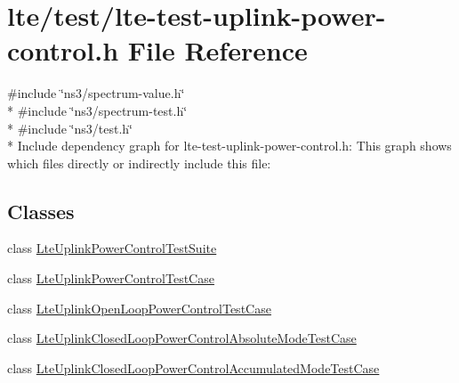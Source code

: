 \hypertarget{lte-test-uplink-power-control_8h}{}\section{lte/test/lte-\/test-\/uplink-\/power-\/control.h File Reference}
\label{lte-test-uplink-power-control_8h}
{\ttfamily \#include \char`\"{}ns3/spectrum-\/value.\+h\char`\"{}}\\*
{\ttfamily \#include \char`\"{}ns3/spectrum-\/test.\+h\char`\"{}}\\*
{\ttfamily \#include \char`\"{}ns3/test.\+h\char`\"{}}\\*
Include dependency graph for lte-\/test-\/uplink-\/power-\/control.h\+:
This graph shows which files directly or indirectly include this file\+:
\subsection*{Classes}
\begin{DoxyCompactItemize}
\item 
class \hyperlink{classLteUplinkPowerControlTestSuite}{Lte\+Uplink\+Power\+Control\+Test\+Suite}
\item 
class \hyperlink{classLteUplinkPowerControlTestCase}{Lte\+Uplink\+Power\+Control\+Test\+Case}
\item 
class \hyperlink{classLteUplinkOpenLoopPowerControlTestCase}{Lte\+Uplink\+Open\+Loop\+Power\+Control\+Test\+Case}
\item 
class \hyperlink{classLteUplinkClosedLoopPowerControlAbsoluteModeTestCase}{Lte\+Uplink\+Closed\+Loop\+Power\+Control\+Absolute\+Mode\+Test\+Case}
\item 
class \hyperlink{classLteUplinkClosedLoopPowerControlAccumulatedModeTestCase}{Lte\+Uplink\+Closed\+Loop\+Power\+Control\+Accumulated\+Mode\+Test\+Case}
\end{DoxyCompactItemize}
